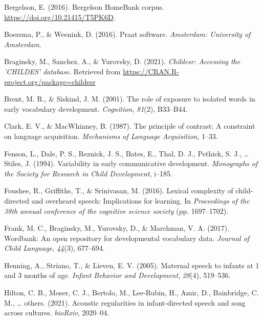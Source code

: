 \documentclass[10pt, letterpaper]{article}
\newenvironment{CSLReferences}%
  {}%
  {\par}
\begin{document}
\hypertarget{refs}{}
\begin{CSLReferences}{1}{0}
\leavevmode\hypertarget{ref-bergelsoncorpus}{}%
Bergelson, E. (2016). Bergelson HomeBank corpus.
\url{https://doi.org/10.21415/T5PK6D}.

\leavevmode\hypertarget{ref-boersma2016praat}{}%
Boersma, P., \& Weenink, D. (2016). Praat software. \emph{Amsterdam:
University of Amsterdam}.

\leavevmode\hypertarget{ref-braginsky2021childesr}{}%
Braginsky, M., Sanchez, A., \& Yurovsky, D. (2021). \emph{Childesr:
Accessing the 'CHILDES' database}. Retrieved from
\url{https://CRAN.R-project.org/package=childesr}

\leavevmode\hypertarget{ref-brent2001role}{}%
Brent, M. R., \& Siskind, J. M. (2001). The role of exposure to isolated
words in early vocabulary development. \emph{Cognition}, \emph{81}(2),
B33--B44.

\leavevmode\hypertarget{ref-clark1987principle}{}%
Clark, E. V., \& MacWhinney, B. (1987). The principle of contrast: A
constraint on language acquisition. \emph{Mechanisms of Language
Acquisition}, 1--33.

\leavevmode\hypertarget{ref-fenson1994variability}{}%
Fenson, L., Dale, P. S., Reznick, J. S., Bates, E., Thal, D. J.,
Pethick, S. J., \ldots{} Stiles, J. (1994). Variability in early
communicative development. \emph{Monographs of the Society for Research
in Child Development}, i--185.

\leavevmode\hypertarget{ref-foushee2016lexical}{}%
Foushee, R., Griffiths, T., \& Srinivasan, M. (2016). Lexical complexity
of child-directed and overheard speech: Implications for learning. In
\emph{Proceedings of the 38th annual conference of the cognitive science
society} (pp. 1697--1702).

\leavevmode\hypertarget{ref-frank2017wordbank}{}%
Frank, M. C., Braginsky, M., Yurovsky, D., \& Marchman, V. A. (2017).
Wordbank: An open repository for developmental vocabulary data.
\emph{Journal of Child Language}, \emph{44}(3), 677--694.

\leavevmode\hypertarget{ref-henning2005maternal}{}%
Henning, A., Striano, T., \& Lieven, E. V. (2005). Maternal speech to
infants at 1 and 3 months of age. \emph{Infant Behavior and
Development}, \emph{28}(4), 519--536.

\leavevmode\hypertarget{ref-hilton2021acoustic}{}%
Hilton, C. B., Moser, C. J., Bertolo, M., Lee-Rubin, H., Amir, D.,
Bainbridge, C. M., \ldots{} others. (2021). Acoustic regularities in
infant-directed speech and song across cultures. \emph{bioRxiv},
2020--04.


\end{CSLReferences}
\end{document}
